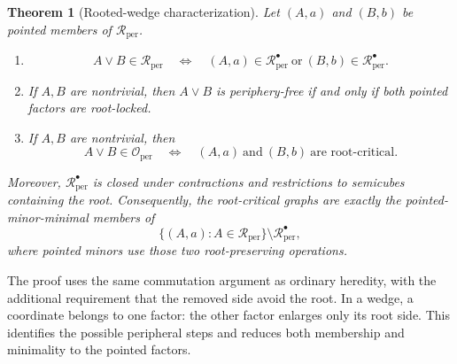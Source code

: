 \documentclass[11pt]{article}
\newtheorem{theorem}{Theorem}[section]
\theoremstyle{definition}
\theoremstyle{remark}
\newcommand{\Rper}{\mathcal R_{\mathrm{per}}}
\newcommand{\Rbullet}{\mathcal R_{\mathrm{per}}^{\bullet}}
\newcommand{\Oper}{\mathcal O_{\mathrm{per}}}
\begin{document}
\begin{theorem}[Rooted-wedge characterization]
\label{thm:rooted-wedge}
Let \((A,a)\) and \((B,b)\) be pointed members of \(\Rper\).
\begin{enumerate}[label=\textup{(\roman*)}]
  \item
  \[
   A\vee B\in\Rper
   \quad\Longleftrightarrow\quad
   (A,a)\in\Rbullet\ \text{or}\ (B,b)\in\Rbullet.
  \]
  \item If \(A,B\) are nontrivial, then \(A\vee B\) is periphery-free if
        and only if both pointed factors are root-locked.
  \item If \(A,B\) are nontrivial, then
  \[
   A\vee B\in\Oper
   \quad\Longleftrightarrow\quad
   (A,a)\ \text{and}\ (B,b)\ \text{are root-critical}.
  \]
\end{enumerate}
Moreover, \(\Rbullet\) is closed under contractions and restrictions to
semicubes containing the root.  Consequently, the root-critical graphs are
exactly the pointed-minor-minimal members of
\[
 \{(A,a):A\in\Rper\}\setminus\Rbullet,
\]
where pointed minors use those two root-preserving operations.
\end{theorem}

The proof uses the same commutation argument as ordinary heredity, with
the additional requirement that the removed side avoid the root. In a
wedge, a coordinate belongs to one factor: the other factor enlarges only
its root side. This identifies the possible peripheral steps and reduces
both membership and minimality to the pointed factors.
\end{document}
